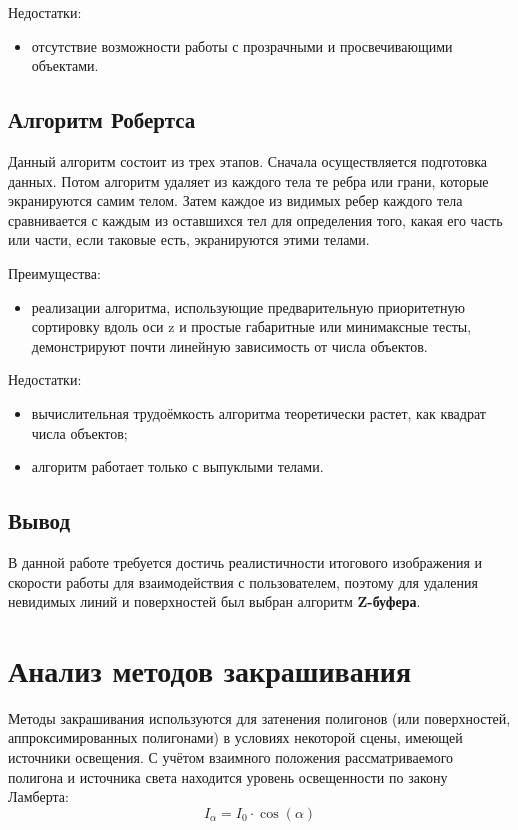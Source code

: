 Недостатки:
\begin{itemize}
    \item отсутствие возможности работы с прозрачными и просвечивающими
         объектами.
\end{itemize}

\subsection{Алгоритм Робертса}

Данный алгоритм состоит из трех этапов. Сначала осуществляется подготовка 
данных. Потом алгоритм удаляет из каждого тела те ребра или грани, которые
экранируются самим телом. Затем каждое из видимых ребер каждого тела
сравнивается с каждым из оставшихся тел для определения того, какая его часть
или части, если таковые есть, экранируются этими телами.

Преимущества:
\begin{itemize}
    \item реализации алгоритма, использующие предварительную приоритетную
        сортировку вдоль оси z и простые габаритные или минимаксные тесты,
        демонстрируют почти линейную зависимость от числа
        объектов.
\end{itemize}

Недостатки:
\begin{itemize}
    \item вычислительная трудоёмкость алгоритма теоретически растет, как
        квадрат числа объектов;
    \item алгоритм работает только с выпуклыми телами.
\end{itemize}

\subsection*{Вывод}

В данной работе требуется достичь реалистичности итогового изображения и
скорости работы для взаимодействия с пользователем, поэтому для удаления
невидимых линий и поверхностей был выбран алгоритм \textbf{Z-буфера}.

\section{Анализ методов закрашивания}

Методы закрашивания используются для затенения полигонов (или поверхностей,
аппроксимированных полигонами) в условиях некоторой сцены, имеющей источники
освещения. С учётом взаимного положения рассматриваемого полигона и источника
света находится уровень освещенности по закону Ламберта:
    $$I_{\alpha} = I_0 \cdot \cos{(\alpha)}$$


